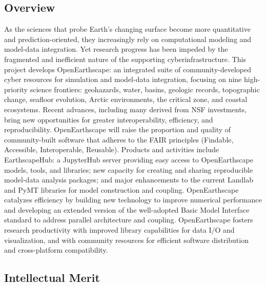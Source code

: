 
\subsection*{Overview}

As the sciences that probe Earth's changing surface become more quantitative and prediction-oriented, they increasingly rely on computational modeling and model-data integration. Yet research progress has been impeded by the fragmented and inefficient nature of the supporting cyberinfrastructure. This project develops OpenEarthscape: an integrated suite of community-developed cyber resources for simulation and model-data integration, focusing on nine high-priority science frontiers: geohazards, water, basins, geologic records, topographic change, seafloor evolution, Arctic environments, the critical zone, and coastal ecosystems. Recent advances, including many derived from NSF investments, bring new opportunities for greater interoperability, efficiency, and reproducibility. OpenEarthscape will raise the proportion and quality of community-built software that adheres to the FAIR principles (Findable, Accessible, Interoperable, Reusable). Products and activities include EarthscapeHub: a JupyterHub server providing easy access to OpenEarthscape models, tools, and libraries; new capacity for creating and sharing reproducible model-data analysis packages; and major enhancements to the current Landlab and PyMT libraries for model construction and coupling. OpenEarthscape catalyzes efficiency by building new technology to improve numerical performance and developing an extended version of the well-adopted Basic Model Interface standard to address parallel architecture and coupling. OpenEarthscape fosters research productivity with improved library capabilities for data I/O and visualization, and with community resources for efficient software distribution and cross-platform compatibility.

\subsection*{Intellectual Merit}

